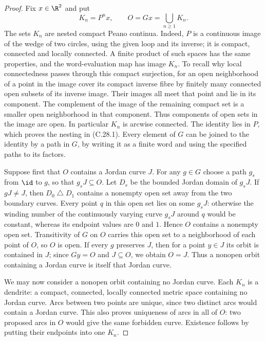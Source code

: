 \begin{proof}
Fix $x\in\R^2$ and put
\[
                  K_n=P^n x,\qquad O=Gx=\bigcup_{n\geq1}K_n.
                                                        \tag{C.28.1}
\]
The sets $K_n$ are nested compact Peano continua. Indeed, $P$ is a
continuous image of the wedge of two circles, using the given loop
and its inverse; it is compact, connected and locally connected.
A finite product of such spaces has the same properties, and the
word-evaluation map has image $K_n$. To recall why local connectedness
passes through this compact surjection, for an open neighborhood of a
point in the image cover its compact inverse fibre by finitely many
connected open subsets of its inverse image. Their images all meet
that point and lie in its component. The complement of the image of
the remaining compact set is a smaller open neighborhood in that
component. Thus components of open sets in the image are open.
In particular $K_n$ is arcwise connected. The identity lies in $P$,
which proves the nesting in (C.28.1). Every element of $G$ can be
joined to the identity by a path in $G$, by writing it as a finite word
and using the specified paths to its factors.

Suppose first that $O$ contains a Jordan curve $J$. For any $g\in G$
choose a path $g_s$ from $\id$ to $g$, so that $g_sJ\subseteq O$.
Let $D_s$ be the bounded Jordan domain of $g_sJ$. If $gJ\ne J$, then
$D_0\mathbin\triangle D_1$ contains a nonempty open set away from the
two boundary curves. Every point $q$ in this open set lies on some
$g_sJ$: otherwise the winding number of the continuously varying curve
$g_sJ$ around $q$ would be constant, whereas its endpoint values are
$0$ and $1$. Hence $O$ contains a nonempty open set. Transitivity of
$G$ on $O$ carries this open set to a neighborhood of each point of
$O$, so $O$ is open. If every $g$ preserves $J$, then for a point
$y\in J$ its orbit is contained in $J$; since $Gy=O$ and $J\subseteq O$,
we obtain $O=J$. Thus a nonopen orbit containing a Jordan curve is
itself that Jordan curve.

We may now consider a nonopen orbit containing no Jordan curve.
Each $K_n$ is a dendrite: a compact, connected, locally connected
metric space containing no Jordan curve. Arcs between two points are
unique, since two distinct arcs would contain a Jordan curve. This
also proves uniqueness of arcs in all of $O$: two proposed arcs in
$O$ would give the same forbidden curve. Existence follows by putting
their endpoints into one $K_n$.


\end{proof}
